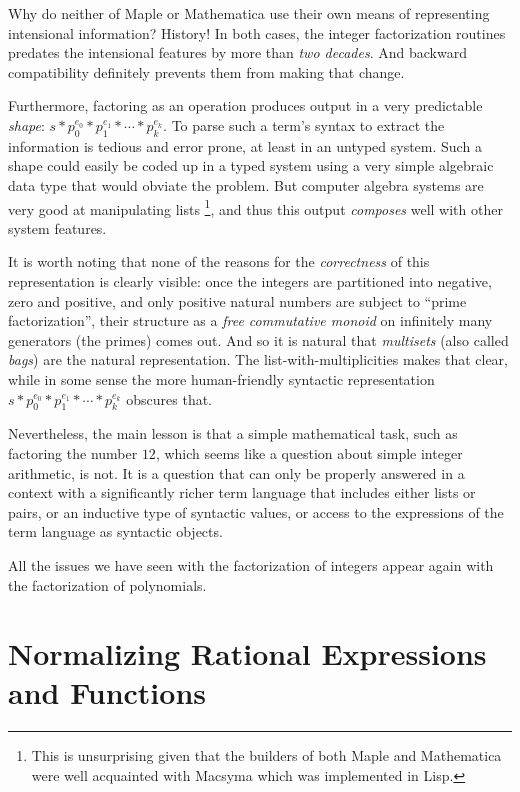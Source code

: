 \documentclass[fleqn]{llncs}
\begin{document}
Why do neither of Maple or Mathematica use their own means of
representing intensional information? History! In both cases, the
integer factorization routines predates the intensional features by
more than \emph{two decades}.  And backward compatibility definitely
prevents them from making that change.

Furthermore, factoring as an operation produces output in a very
predictable \emph{shape}: $s * p_0^{e_0} * p_1^{e_1} * \cdots *
p_k^{e_k}$.  To parse such a term's syntax to extract the information
is tedious and error prone, at least in an untyped system. Such a
shape could easily be coded up in a typed system using a very simple
algebraic data type that would obviate the problem. But computer
algebra systems are very good at manipulating lists%
\footnote{This is unsurprising given that the builders of both Maple
  and Mathematica were well acquainted with Macsyma which was
  implemented in Lisp.}, and thus this output \emph{composes} well
with other system features.

It is worth noting that none of the reasons for the \emph{correctness}
of this representation is clearly visible: once the integers are
partitioned into negative, zero and positive, and only positive
natural numbers are subject to ``prime factorization'', their structure
as a \emph{free commutative monoid} on infinitely many generators (the primes)
comes out. And so it is natural that \emph{multisets} (also called \emph{bags})
are the natural representation. The list-with-multiplicities makes that
clear, while in some sense the more human-friendly syntactic representation
$s * p_0^{e_0} * p_1^{e_1} * \cdots * p_k^{e_k}$ obscures that.

Nevertheless, the main lesson is that a simple mathematical task, such
as factoring the number $12$, which seems like a question about simple
integer arithmetic, is not.  It is a question that can only be
properly answered in a context with a significantly richer term
language that includes either lists or pairs, or an inductive type of
syntactic values, or access to the expressions of the term language as
syntactic objects.

All the issues we have seen with the factorization of integers appear
again with the factorization of polynomials.

\section{Normalizing Rational Expressions and Functions}\label{sec:rational}
\end{document}

